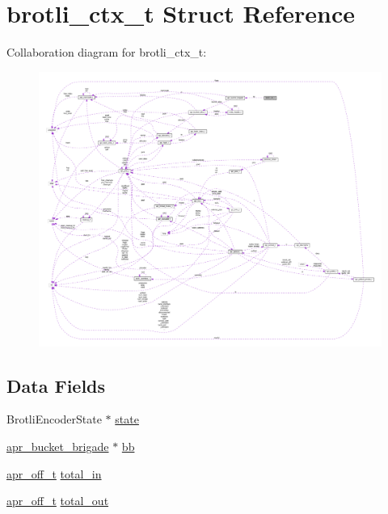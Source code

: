 \hypertarget{structbrotli__ctx__t}{}\section{brotli\+\_\+ctx\+\_\+t Struct Reference}
\label{structbrotli__ctx__t}


Collaboration diagram for brotli\+\_\+ctx\+\_\+t\+:
\nopagebreak
\begin{figure}[H]
\begin{center}
\leavevmode
\includegraphics[width=350pt]{structbrotli__ctx__t__coll__graph}
\end{center}
\end{figure}
\subsection*{Data Fields}
\begin{DoxyCompactItemize}
\item 
Brotli\+Encoder\+State $\ast$ \hyperlink{structbrotli__ctx__t_abfd14ab6f7cbdaf2bfb6710790393a47}{state}
\item 
\hyperlink{structapr__bucket__brigade}{apr\+\_\+bucket\+\_\+brigade} $\ast$ \hyperlink{structbrotli__ctx__t_a4d739d1178c45be67c806d189fbb3d4e}{bb}
\item 
\hyperlink{group__apr__platform_ga6938af9075cec15c88299109381aa984}{apr\+\_\+off\+\_\+t} \hyperlink{structbrotli__ctx__t_a35fd446b4c63516dfcc9fcff350466a9}{total\+\_\+in}
\item 
\hyperlink{group__apr__platform_ga6938af9075cec15c88299109381aa984}{apr\+\_\+off\+\_\+t} \hyperlink{structbrotli__ctx__t_a3d7612e4bdff4a7ded3e614700bfce09}{total\+\_\+out}
\end{DoxyCompactItemize}


